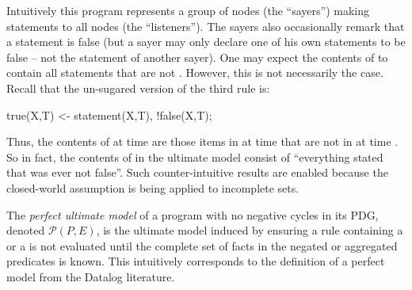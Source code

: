 Intuitively this program represents a group of nodes (the ``sayers'') making statements to all nodes (the ``listeners'').  The sayers also occasionally remark that a statement is false (but a sayer may only declare one of his own statements to be false -- not the statement of another sayer).  One may expect the contents of  to contain all statements that are not .  However, this is not necessarily the case.  Recall that the un-sugared version of the third rule is:

\begin{Dedalus}
true(X,T) <- statement(X,T), !false(X,T);
\end{Dedalus}

\noindent
Thus, the contents of  at time  are those items in  at time  that are not in  at time .  So in fact, the contents of  in the ultimate model consist of ``everything stated that was ever not false''.  Such counter-intuitive results are enabled because the closed-world assumption is being applied to incomplete sets.

\begin{definition}
The {\em perfect ultimate model} of a \lang program with no negative cycles in its PDG, denoted $\mathcal{P}(P, E)$, is the ultimate model induced by ensuring a rule containing a \dedalus{!} or a  is not evaluated until the complete set of facts in the negated or aggregated predicates is known.
This intuitively corresponds to the definition of a perfect model from the Datalog literature.
\end{definition}


